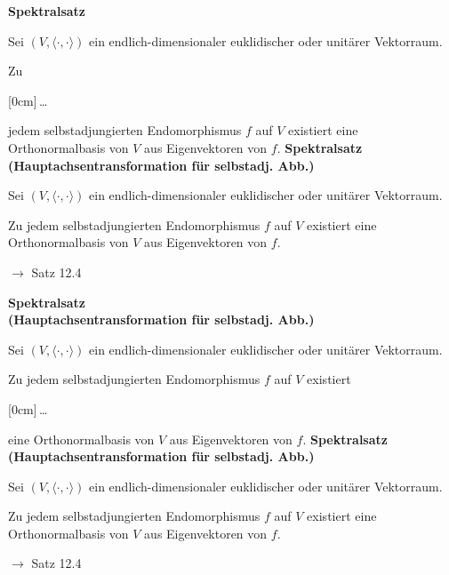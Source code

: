 \documentclass[11pt]{article}
\renewcommand{\cite}[1]{\par\bigskip\hfill{\color{gray}\tiny\(\to\) #1}}
\newcommand*{\scprod}[2]{\langle #1, #2\rangle} %
\newcommand{\hide}[1]{\parbox{0cm}{\raisebox{-7pt}[0cm]{\dots}}\color{white}#1\color{black}}
\let\olddots\dots
\renewcommand{\dots}{\,\olddots\,}
\newenvironment{field}{}{\newpage}
\newif\ifnote
\newenvironment{note}{\notetrue}{\notefalse}
\newcommand{\localtag}{}
\newcommand{\globaltag}{}
\newcommand{\uuid}{}
\newcommand{\tags}[1]{
    \ifnote
        \renewcommand{\localtag}{#1}
    \else
        \renewcommand{\globaltag}{#1}
    \fi
    }
\newcommand{\xplain}[1]{\renewcommand{\uuid}{#1}}
\begin{document}
\begin{note}%
    \tags{Satz}
    \xplain{c8642aef-feb0-4273-9657-9874c2229640}
    \begin{field}
        \textbf{Spektralsatz\\}

        Sei $(V, \scprod{\cdot}{\cdot})$ ein endlich-dimensionaler euklidischer oder unitärer Vektorraum.

        Zu \hide{jedem selbstadjungierten Endomorphismus} $f$ auf $V$ existiert eine Orthonormalbasis von $V$ aus Eigenvektoren von $f$.
    \end{field}
    \begin{field}
        \textbf{Spektralsatz\\ (Hauptachsentransformation für selbstadj. Abb.)}

        Sei $(V, \scprod{\cdot}{\cdot})$ ein endlich-dimensionaler euklidischer oder unitärer Vektorraum.

        Zu jedem selbstadjungierten Endomorphismus $f$ auf $V$ existiert eine Orthonormalbasis von $V$ aus Eigenvektoren von $f$.
        \cite{Satz 12.4}
    \end{field}

    \begin{field}
        \textbf{Spektralsatz\\ (Hauptachsentransformation für selbstadj. Abb.)}

        Sei $(V, \scprod{\cdot}{\cdot})$ ein endlich-dimensionaler euklidischer oder unitärer Vektorraum.

        Zu jedem selbstadjungierten Endomorphismus $f$ auf $V$ existiert \hide{eine Orthonormalbasis von $V$ aus Eigenvektoren von $f$.}
    \end{field}
    \begin{field}
        \textbf{Spektralsatz\\ (Hauptachsentransformation für selbstadj. Abb.)}

        Sei $(V, \scprod{\cdot}{\cdot})$ ein endlich-dimensionaler euklidischer oder unitärer Vektorraum.

        Zu jedem selbstadjungierten Endomorphismus $f$ auf $V$ existiert eine Orthonormalbasis von $V$ aus Eigenvektoren von $f$.
        \cite{Satz 12.4}
    \end{field}
\end{note}
\end{document}
